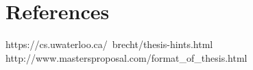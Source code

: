 \newpage
\section{References}

https://cs.uwaterloo.ca/~brecht/thesis-hints.html
\\
http://www.mastersproposal.com/format\_of\_thesis.html

